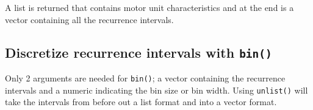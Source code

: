 \documentclass[]{article}
\newenvironment{Shaded}{\begin{snugshade}}{\end{snugshade}}
\newcommand{\KeywordTok}[1]{\textcolor[rgb]{0.13,0.29,0.53}{\textbf{#1}}}
\newcommand{\DataTypeTok}[1]{\textcolor[rgb]{0.13,0.29,0.53}{#1}}
\newcommand{\FloatTok}[1]{\textcolor[rgb]{0.00,0.00,0.81}{#1}}
\newcommand{\StringTok}[1]{\textcolor[rgb]{0.31,0.60,0.02}{#1}}
\newcommand{\OperatorTok}[1]{\textcolor[rgb]{0.81,0.36,0.00}{\textbf{#1}}}
\newcommand{\NormalTok}[1]{#1}
\begin{document}
A list is returned that contains motor unit characteristics and at the
end is a vector containing all the recurrence intervals.

\subsection{\texorpdfstring{Discretize recurrence intervals with
\texttt{bin()}}{Discretize recurrence intervals with bin()}}\label{discretize-recurrence-intervals-with-bin}

Only 2 arguments are needed for \texttt{bin()}; a vector containing the
recurrence intervals and a numeric indicating the bin size or bin width.
Using \texttt{unlist()} will take the intervals from before out a list
format and into a vector format.

\begin{Shaded}
\end{Shaded}
\end{document}
